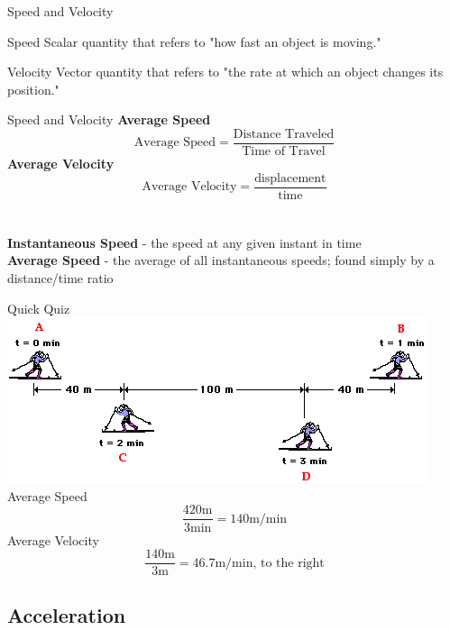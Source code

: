 \documentclass{beamer}
\begin{document}
\begin{frame}{Speed and Velocity}
	\begin{block}{Speed}
		Scalar quantity that refers to "how fast an object is moving."
	\end{block}
	\begin{block}{Velocity}
		Vector quantity that refers to "the rate at which an object changes its position."
	\end{block}
\end{frame}

\begin{frame}{Speed and Velocity}
	\textbf{Average Speed}
	\begin{equation}
		\text{Average Speed} = \frac{\text{Distance Traveled}}{\text{Time of Travel}}
	\end{equation}
	\textbf{Average Velocity}
	\begin{equation}
		\text{Average Velocity} = \frac{\text{displacement}}{\text{time}}
	\end{equation} \\~\\
	\textbf{Instantaneous Speed} - the speed at any given instant in time \\
	\textbf{Average Speed} - the average of all instantaneous speeds; found simply by a distance/time ratio
\end{frame}

\begin{frame}{Quick Quiz}
	\includegraphics[scale=0.5]{distancedispquiz.png}\centering \\
	Average Speed
	\pause
	$$ \frac{420\text{m}}{3\text{min}} = 140\text{m/min}$$
	\pause
	Average Velocity
	\pause
	$$ \frac{140\text{m}}{3\text{m}} = 46.7\text{m/min, to the right}$$
\end{frame}



\subsection{Acceleration}
\end{document}
